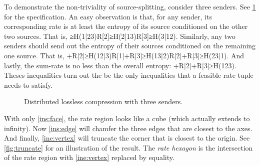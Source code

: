 \documentclass[openany]{amsbook}
\numberwithin{equation}{chapter}
\numberwithin{figure}{chapter}
\numberwithin{table}{chapter}
\def\[#1\]{\begin{equation*}{#1}\end{equation*}}
\theoremstyle{definition}	理dfn:Definition~?s			理exa:Example~?s
\theoremstyle{remark}		理cla:Claim~?s				理rem:Remark~?s
\begin{document}
	To demonstrate the non-triviality of source-splitting, consider three senders.
	See \cref{fig:3sender} for the specification.
	An easy observation is that, for any sender, its corresponding rate
	is at least the entropy of its source conditioned on the other two sources.
	That is,
	\[R[1]≥H(1|23)\quad R[2]≥H(2|13)\quad R[3]≥H(3|12).\label{ins:face}\]
	Similarly, any two senders should send out the entropy of
	their sources conditioned on the remaining one source.
	That is,
	\[R[1]+R[2]≥H(12|3)\quad R[1]+R[3]≥H(13|2)\quad R[2]+R[3]≥H(23|1).\label{ins:edge}\]
	And lastly, the sum-rate is no less than the overall entropy:
	\[R[1]+R[2]+R[3]≥H(123).\label{ine:vertex}\]
	Theses inequalities turn out the be the only inequalities
	that a feasible rate tuple needs to satisfy.
	
	\begin{figure}
		\caption{
			Distributed lossless compression with three senders.
		}\label{fig:3sender}
	\end{figure}
	
	With only \cref{ins:face}, the rate region looks like a cube
	(which actually extends to infinity).
	Now \cref{ins:edge} will chamfer the three edges that are closest to the axes.
	And finally, \cref{ine:vertex} will truncate
	the corner that is closest to the origin.
	See \cref{fig:truncate} for an illustration of the result.
	The \emph{rate hexagon} is the intersection of
	the rate region with \cref{ine:vertex} replaced by equality.
	
\end{document}
